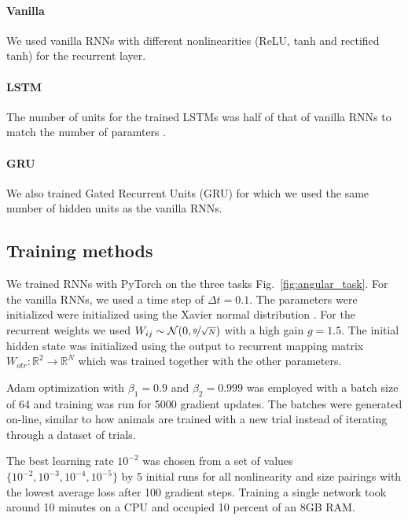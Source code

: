 \documentclass{article} %
\newcounter{ct}
\newcommand{\reals}{\mathbb{R}}
\theoremstyle{definition}
\theoremstyle{remark}
\begin{document}
\paragraph{Vanilla}
We used vanilla RNNs with different nonlinearities (ReLU, tanh and rectified tanh) for the recurrent layer.


\paragraph{LSTM}
The number of units for the trained LSTMs was half of that of vanilla RNNs to match the number of paramters \citep{Hochreiter1997}.


\paragraph{GRU}
We also trained Gated Recurrent Units (GRU) \citep{cho2014learning} for which we used the same number of hidden units as the vanilla RNNs.




\subsection{Training methods}
We trained  RNNs with PyTorch \citep{paszke2017automatic}  on the three tasks Fig.~\ref{fig:angular_task}.	
For the vanilla RNNs, we used a time step of $\Delta t=0.1$.
The parameters were initialized were initialized using the Xavier normal distribution \citep{Glorot2010}.
For the recurrent weights we used \(W_{ij}\sim\mathcal{N}(0, \nicefrac{g}{\sqrt{N}})\) with a high gain \(g=1.5\).
The initial hidden state was initialized using the output to recurrent mapping matrix \(W_{otr}\colon\reals^2\rightarrow\reals^{N}\) which was trained together with the other parameters.

Adam optimization with \(\beta_1=0.9\) and \(\beta_2=0.999\) was employed with a batch size of 64 and training was run for 5000 gradient updates.
The batches were generated on-line, similar to how animals are trained with a new trial instead of iterating through a dataset of trials.


The best learning rate $10^{-2}$ was chosen from a set of values \(\{10^{-2},10^{-3},10^{-4},10^{-5}\}\) by 5 initial runs for all nonlinearity and size pairings with the lowest average loss after 100 gradient steps.
Training a single network took around 10 minutes on a CPU and occupied 10 percent of an 8GB RAM.
\end{document}
